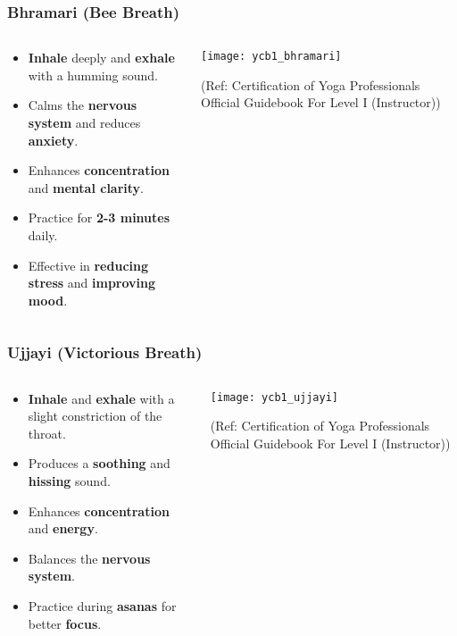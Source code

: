 \begin{frame}[fragile]\frametitle{Bhramari (Bee Breath)}
\begin{columns}
    \begin{column}[T]{0.5\linewidth}
      \begin{itemize}
        \item \textbf{Inhale} deeply and \textbf{exhale} with a humming sound.
        \item Calms the \textbf{nervous system} and reduces \textbf{anxiety}.
        \item Enhances \textbf{concentration} and \textbf{mental clarity}.
        \item Practice for \textbf{2-3 minutes} daily.
        \item Effective in \textbf{reducing stress} and \textbf{improving mood}.
      \end{itemize}
    \end{column}
    \begin{column}[T]{0.5\linewidth}
        \begin{center}
        \texttt{[image: ycb1\_bhramari]}
				
		{\tiny (Ref: Certification  of Yoga Professionals Official Guidebook For Level I (Instructor))}	 
        \end{center}	
    \end{column}
\end{columns}
\end{frame}

\begin{frame}[fragile]\frametitle{Ujjayi (Victorious Breath)}
\begin{columns}
    \begin{column}[T]{0.5\linewidth}
      \begin{itemize}
        \item \textbf{Inhale} and \textbf{exhale} with a slight constriction of the throat.
        \item Produces a \textbf{soothing} and \textbf{hissing} sound.
        \item Enhances \textbf{concentration} and \textbf{energy}.
        \item Balances the \textbf{nervous system}.
        \item Practice during \textbf{asanas} for better \textbf{focus}.
      \end{itemize}
    \end{column}
    \begin{column}[T]{0.5\linewidth}
        \begin{center}
        \texttt{[image: ycb1\_ujjayi]}
				
		{\tiny (Ref: Certification  of Yoga Professionals Official Guidebook For Level I (Instructor))}	 
        \end{center}	
    \end{column}
\end{columns}
\end{frame}

